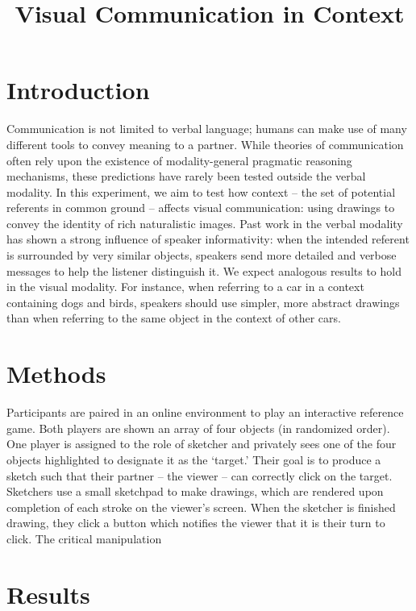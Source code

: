 \documentclass[11pt, oneside]{article}   	%
\title{Visual Communication in Context}
\date{}							%
\begin{document}
\maketitle
\section{Introduction}

Communication is not limited to verbal language; humans can make use of many different tools to convey meaning to a partner. While theories of communication often rely upon the existence of modality-general pragmatic reasoning mechanisms, these predictions have rarely been tested outside the verbal modality. In this experiment, we aim to test how context -- the set of potential referents in common ground -- affects visual communication: using drawings to convey the identity of rich naturalistic images. Past work in the verbal modality has shown a strong influence of speaker informativity: when the intended referent is surrounded by very similar objects, speakers send more detailed and verbose messages to help the listener distinguish it. We expect analogous results to hold in the visual modality. For instance, when referring to a car in a context containing dogs and birds, speakers should use simpler, more abstract drawings than when referring to the same object in the context of other cars.

\section{Methods}

Participants are paired in an online environment to play an interactive reference game. Both players are shown an array of four objects (in randomized order). One player is assigned to the role of sketcher and privately sees one of the four objects highlighted to designate it as the `target.' Their goal is to produce a sketch such that their partner -- the viewer -- can correctly click on the target. Sketchers use a small sketchpad to make drawings, which are rendered upon completion of each stroke on the viewer's screen. When the sketcher is finished drawing, they click a button which notifies the viewer that it is their turn to click. The critical manipulation 

\section{Results}
\end{document}
